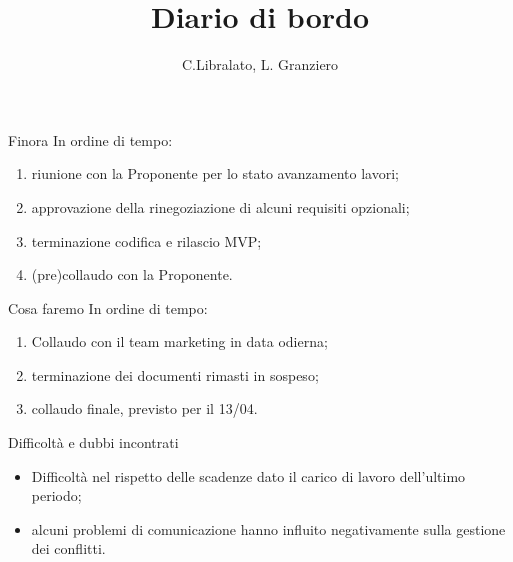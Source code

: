 \documentclass{beamer}
\title{Diario di bordo}
\author[C.Libralato, L. Granziero]{C.Libralato, L. Granziero}
\begin{document}
{
\begin{frame}
    \titlepage
\end{frame}
}

\begin{frame}{Finora}
    In ordine di tempo:
    \begin{enumerate}
        \setlength{\itemsep}{0.9em}
        \item riunione con la Proponente per lo stato avanzamento lavori;
        \item approvazione della rinegoziazione di alcuni requisiti opzionali;
        \item terminazione codifica e rilascio MVP;
        \item (pre)collaudo con la Proponente.
    
    \end{enumerate}
\end{frame}

\begin{frame}{Cosa faremo}
    In ordine di tempo:
    \begin{enumerate}
        \setlength{\itemsep}{1.2em}
        \item Collaudo con il team marketing in data odierna;
        \item terminazione dei documenti rimasti in sospeso;
        \item collaudo finale, previsto per il 13/04.
        
    \end{enumerate}
\end{frame}


\begin{frame}{Difficoltà e dubbi incontrati}
     \begin{center}
         \begin{itemize}
             \item Difficoltà nel rispetto delle scadenze dato il carico di lavoro dell'ultimo periodo;
             \item alcuni problemi di comunicazione hanno influito negativamente sulla gestione dei conflitti.
         \end{itemize}
     \end{center}
 \end{frame}
\end{document}
